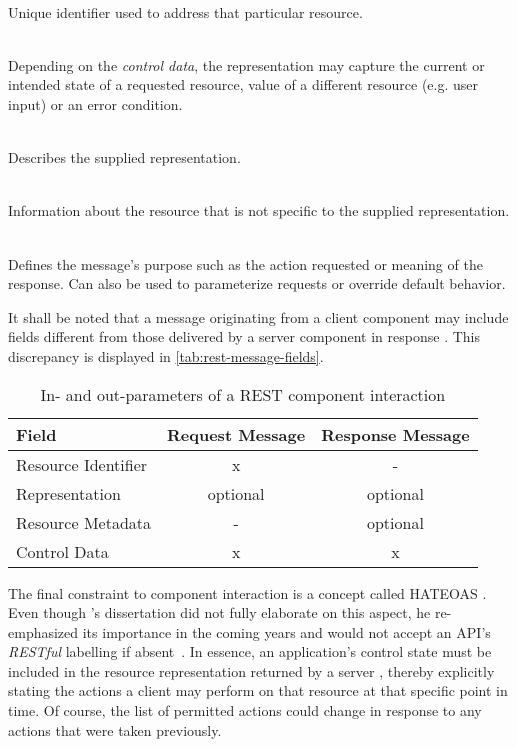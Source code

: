 \begin{appendices}
\begin{description}[format={\storedescriptionlabel}]
	\item[Resource identifier]
	\hfill \\
	Unique identifier used to address that particular resource.
	\item[Representation]
	\hfill \\
	Depending on the \textit{control data}, the representation may capture the current or intended state of a requested resource, value of a different resource (e.g. user input) or an error condition.
	\item[Representation metadata]
	\hfill \\
	Describes the supplied representation.
	\item[Resource metadata]
	\hfill \\
	Information about the resource that is not specific to the supplied representation.
	\item[Control data]
	\hfill \\
	Defines the message's purpose such as the action requested or meaning of the response. Can also be used to parameterize requests or override default behavior.
\end{description}

It shall be noted that a message originating from a client component may include fields different from those delivered by a server component in response \cite[pp.~93--94]{fielding2000architectural}. This discrepancy is displayed in \autoref{tab:rest-message-fields}.

\begin{table}[hbt]
	\centering
  	\begin{tabular}{l|c|c}
	    Field & Request Message & Response Message \\
	    \hline
	    Resource Identifier 	& x & - \\
	    Representation 			& optional & optional \\
	    Resource Metadata 		& - & optional \\
	    Control Data 			& x & x \\
	\end{tabular}
  	\caption{In- and out-parameters of a \acs*{REST} component interaction}
  	\label{tab:rest-message-fields}
\end{table}

The final constraint to component interaction is a concept called \acl*{HATEOAS} \cite[p.~82]{fielding2000architectural}. Even though \citeauthor{fielding2000architectural}'s dissertation did not fully elaborate on this aspect, he re-emphasized its importance in the coming years and would not accept an \acs{API}'s \textit{\ac{REST}ful} labelling if absent~\cite{fielding2008hypertext}. In essence, an application's control state must be included in the resource representation returned by a server \cite[p.~102]{fielding2000architectural}, thereby explicitly stating the actions a client may perform on that resource at that specific point in time. Of course, the list of permitted actions could change in response to any actions that were taken previously.



\end{appendices}
